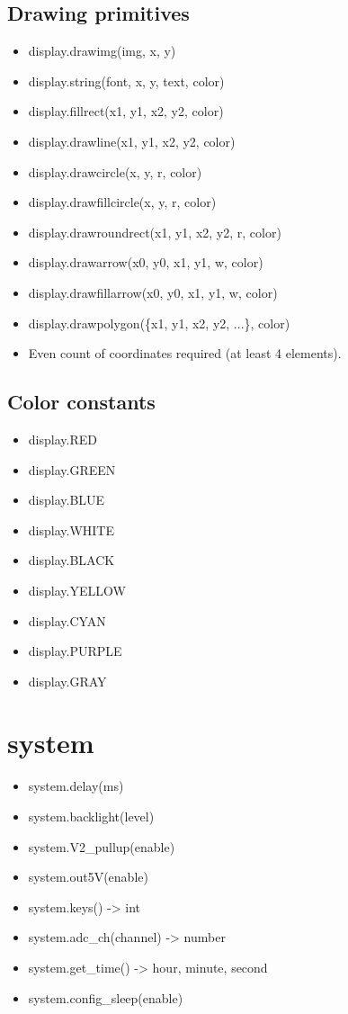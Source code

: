 \subsection{Drawing primitives}
\begin{itemize}
\item display.drawimg(img, x, y)
\item display.string(font, x, y, text, color)
\item display.fillrect(x1, y1, x2, y2, color)
\item display.drawline(x1, y1, x2, y2, color)
\item display.drawcircle(x, y, r, color)
\item display.drawfillcircle(x, y, r, color)
\item display.drawroundrect(x1, y1, x2, y2, r, color)
\item display.drawarrow(x0, y0, x1, y1, w, color)
\item display.drawfillarrow(x0, y0, x1, y1, w, color)
\item display.drawpolygon(\{x1, y1, x2, y2, ...\}, color)
\end{itemize}
\begin{itemize}
\item Even count of coordinates required (at least 4 elements).
\end{itemize}
\subsection{Color constants}
\begin{itemize}
\item display.RED
\item display.GREEN
\item display.BLUE
\item display.WHITE
\item display.BLACK
\item display.YELLOW
\item display.CYAN
\item display.PURPLE
\item display.GRAY
\end{itemize}
\section{system}
\begin{itemize}
\item system.delay(ms)
\item system.backlight(level)
\item system.V2\_pullup(enable)
\item system.out5V(enable)
\item system.keys() -> int
\item system.adc\_ch(channel) -> number
\item system.get\_time() -> hour, minute, second
\item system.config\_sleep(enable)
\end{itemize}

